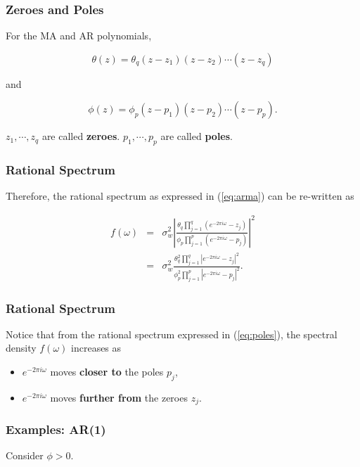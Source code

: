 \documentclass[%
xcolor=pdftex]{beamer}
\begin{document}
\begin{frame}
\frametitle{Zeroes and Poles}

For the MA and AR polynomials,

$$
\theta(z) = \theta_q(z-z_1)(z-z_2)\cdots(z-z_q)
$$

and

$$
\phi(z) = \phi_p(z-p_1)(z-p_2)\cdots(z-p_p).
$$

$z_1,\cdots, z_q$ are called \textbf{zeroes}. $p_1,\cdots,p_p$ are called \textbf{poles}.

\end{frame}

\begin{frame}
\frametitle{Rational Spectrum}

Therefore, the rational spectrum as expressed in (\ref{eq:arma}) can be re-written as

\begin{eqnarray} \label{eq:poles}
f(\omega) &=& \sigma_w^2  \left\lvert \frac{\theta_q \prod_{j=1}^q \left( e^{-2 \pi i \omega} - z_j \right)}{\phi_p \prod_{j=1}^p \left( e^{-2 \pi i \omega} - p_j \right)} \right\rvert  ^2 \nonumber \\
          &=& \sigma_w^2 \frac{\theta_q^2 \prod_{j=1}^q \left\lvert e^{-2 \pi i \omega} - z_j \right\rvert ^2}{\phi_p^2 \prod_{j=1}^p \left\lvert e^{-2 \pi i \omega} - p_j \right\rvert ^2}.
\end{eqnarray}

\end{frame}

\begin{frame}
\frametitle{Rational Spectrum}

Notice that from the rational spectrum expressed in (\ref{eq:poles}), the spectral density $f(\omega)$ increases as

\begin{itemize}
\item $e^{-2 \pi i \omega}$ moves \textbf{closer to} the poles $p_j$,
\item $e^{-2 \pi i \omega}$ moves \textbf{further from} the zeroes $z_j$.
\end{itemize}

\end{frame}

\begin{frame}
\frametitle{Examples: AR(1)}

Consider $\phi>0$.

\vspace{50mm}

\end{frame}
\end{document}
